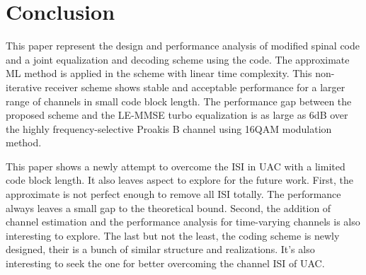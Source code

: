 \documentclass[conference]{IEEEtran}
\begin{document}

\section{Conclusion}
This paper represent the design and performance analysis of modified spinal code and a joint equalization and decoding scheme using the code. The approximate ML method is applied in the scheme with linear time complexity.  This non-iterative receiver scheme shows stable and acceptable performance for a larger range of channels in small code block length. The performance gap between the proposed scheme and the LE-MMSE turbo equalization is as large as 6dB over the highly frequency-selective Proakis B channel using 16QAM modulation method. 

This paper shows a newly attempt to overcome the ISI in UAC with a limited code block length. It also leaves aspect to explore for the future work. First, the approximate is not perfect enough to remove all ISI totally. The performance always leaves a small gap to the theoretical bound. Second, the addition of channel estimation and the performance analysis for time-varying channels is also interesting to explore. The last but not the least, the coding scheme is newly designed, their is a bunch of similar structure and realizations. It's also interesting to seek the one for better overcoming the channel ISI of UAC.








\end{document}
